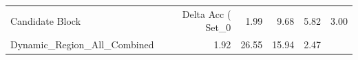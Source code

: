 \begin{tabular}{lrrrr}
\toprule
Candidate Block & Delta Acc (%
\midrule
Set_0 & 1.99 & 9.68 & 5.82 & 3.00 \\
Dynamic_Region_All_Combined & 1.92 & 26.55 & 15.94 & 2.47 \\
\bottomrule
\end{tabular}
